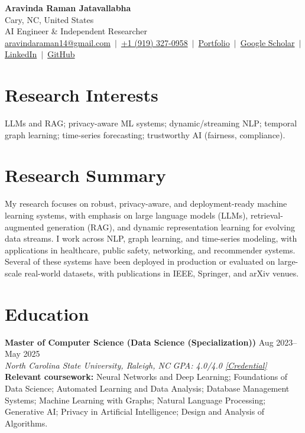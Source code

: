 \documentclass[11pt,a4paper]{article}
\newcommand{\cvEntry}[4]{\textbf{#1} \hfill #2 \\ \textit{#3} \hfill \textit{#4} \vspace{2pt}}
\begin{document}

\begin{center}
{\LARGE \textbf{Aravinda Raman Jatavallabha}} \\
Cary, NC, United States \\
AI Engineer \& Independent Researcher \\[4pt]
\href{mailto:aravindaraman14@gmail.com}{aravindaraman14@gmail.com} \,$|$\, \href{tel:+19193270958}{+1 (919) 327-0958} \,$|$\, \href{https://aravinda-1402.github.io/}{Portfolio} \,$|$\, \href{https://scholar.google.com/citations?user=fXRLPrEAAAAJ\&hl=en}{Google Scholar} \,$|$\, \href{https://linkedin.com/in/aravinda-jatavallabha}{LinkedIn} \,$|$\, \href{https://github.com/aravinda-1402}{GitHub}
\end{center}
\vspace{4pt}

\section{Research Interests}
\small
LLMs and RAG; privacy-aware ML systems; dynamic/streaming NLP; temporal graph learning; time-series forecasting; trustworthy AI (fairness, compliance).
\vspace{4pt}

\section{Research Summary}
\small
My research focuses on robust, privacy-aware, and deployment-ready machine learning systems, with emphasis on large language models (LLMs), retrieval-augmented generation (RAG), and dynamic representation learning for evolving data streams. I work across NLP, graph learning, and time-series modeling, with applications in healthcare, public safety, networking, and recommender systems. Several of these systems have been deployed in production or evaluated on large-scale real-world datasets, with publications in IEEE, Springer, and arXiv venues.
\vspace{4pt}

\section{Education}

\cvEntry{Master of Computer Science (Data Science (Specialization))}{Aug 2023--May 2025}{North Carolina State University, Raleigh, NC}{GPA: 4.0/4.0 \href{https://drive.google.com/file/d/1uPDeOb_QWkxuiRlXxEfEIW2JagjP5olQ/view?usp=drive_link}{[Credential]}}
\\
\textbf{Relevant coursework:} Neural Networks and Deep Learning; Foundations of Data Science; Automated Learning and Data Analysis; Database Management Systems; Machine Learning with Graphs; Natural Language Processing; Generative AI; Privacy in Artificial Intelligence; Design and Analysis of Algorithms.
\vspace{6pt}
\end{document}
